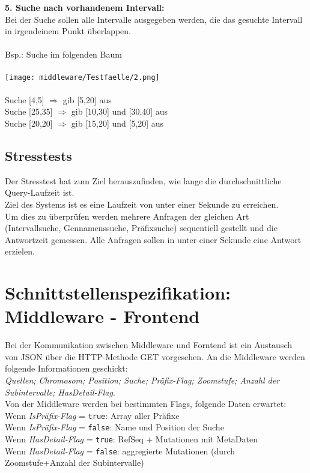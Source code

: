 \documentclass{scrartcl}
\begin{document}
\textbf{5. Suche nach vorhandenem Intervall:}\\
Bei der Suche sollen alle Intervalle ausgegeben werden, die das gesuchte Intervall in irgendeinem Punkt überlappen.\\\\
Bsp.: Suche im folgenden Baum\\\\
\texttt{[image: middleware/Testfaelle/2.png]}\\\\Suche [4,5] $\Rightarrow$ gib [5,20] aus\\
Suche [25,35] $\Rightarrow$ gib [10,30] und [30,40] aus\\
Suche [20,20] $\Rightarrow$ gib [15,20] und [5,20] aus
\subsection{Stresstests}
Der Stresstest hat zum Ziel herauszufinden, wie lange die durchschnittliche Query-Laufzeit ist.\\
Ziel des Systems ist es eine Laufzeit von unter einer Sekunde zu erreichen.\\
Um dies zu überprüfen werden mehrere Anfragen der gleichen Art (Intervallsuche, Gennamenssuche, Präfixsuche) sequentiell gestellt und die Antwortzeit gemessen. Alle Anfragen sollen in unter einer Sekunde eine Antwort erzielen.
\newpage
\section{Schnittstellenspezifikation: Middleware - Frontend}
Bei der Kommunikation zwischen Middleware und Forntend ist ein Austausch von JSON über die HTTP-Methode GET vorgesehen.
An die Middleware werden folgende Informationen geschickt:
\\
\textit{Quellen; Chromosom; Position; Suche; Präfix-Flag; Zoomstufe; Anzahl der Subintervalle; HasDetail-Flag}.\\
Von der Middleware werden bei bestimmten Flags, folgende Daten erwartet:
\\
Wenn \textit{IsPräfix-Flag} = \texttt{true}: Array aller Präfixe\\
Wenn \textit{IsPräfix-Flag} = \texttt{false}: Name und Position der Suche\\[1em]
Wenn \textit{HasDetail-Flag} = \texttt{true}: RefSeq + Mutationen mit MetaDaten\\
Wenn \textit{HasDetail-Flag} = \texttt{false}: aggregierte Mutationen (durch Zoomstufe+Anzahl der Subintervalle)
\end{document}
